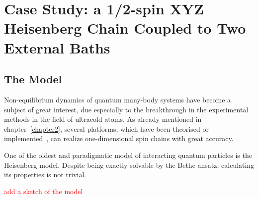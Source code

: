 \chapter{Case Study: a 1/2-spin XYZ Heisenberg Chain Coupled to Two External Baths}
\label{Chapter3}

\section{The Model}
\label{sec:model}
Non-equilibrium dynamics of quantum many-body systems have become a subject of great interest, due especially to the breakthrough in the experimental methods in the field of ultracold atoms. As already mentioned in chapter~\ref{chapter2}, several platforms, which have been theorised or implemented~\cite{exp_spinChain}, can realize one-dimensional spin chains with great accuracy. 

One of the oldest and paradigmatic model of interacting quantum particles is the Heisenberg model. Despite being exactly solvable by the Bethe ansatz, calculating its properties is not trivial. 

\textcolor{red}{add a sketch of the model}

